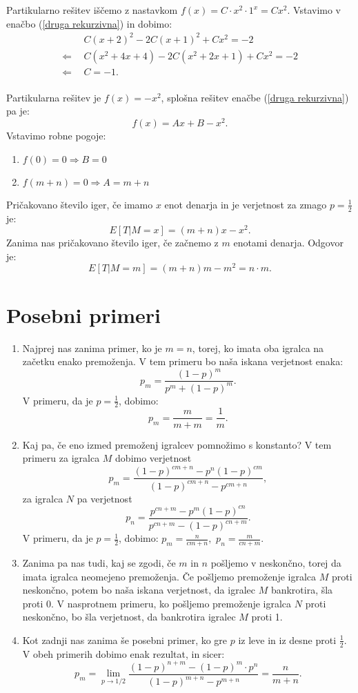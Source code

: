 \documentclass[12pt, a4paper]{article}
\begin{document}
Partikularno rešitev iščemo z nastavkom $f(x)=C\cdot x^2\cdot 1^x= Cx^2$. Vstavimo v enačbo (\ref{druga rekurzivna}) in dobimo:
\begin{equation*}
\begin{split}
 & ~~C(x+2)^2-2C(x+1)^2+Cx^2=-2\\
\Leftarrow & ~~C(x^2+4x+4)-2C(x^2+2x+1)+Cx^2=-2\\
\Leftarrow &  ~~C = -1 .\\
\end{split}
\end{equation*}

Partikularna rešitev je $f(x)=-x^2$, splošna rešitev enačbe (\ref{druga rekurzivna}) pa je: $$f(x)=Ax+B-x^2.$$
Vstavimo robne pogoje:
\begin{enumerate}
\item $f(0)=0\Rightarrow B = 0$
\item $f(m+n)=0 \Rightarrow A = m+n$
\end{enumerate}
Pričakovano število iger, če imamo $x$ enot denarja in je verjetnost za zmago $p=\frac{1}{2}$ je: $$E[T|M=x]= (m+n)x-x^2.$$
Zanima nas pričakovano število iger, če začnemo z $m$ enotami denarja. Odgovor je:$$E[T|M=m]=(m+n)m-m^2= n\cdot m.$$

\newpage

\section{Posebni primeri}

\begin{enumerate}
\item Najprej nas zanima primer, ko je $m = n$, torej, ko imata oba igralca na začetku enako premoženja. V tem primeru bo naša iskana verjetnost enaka: 
$$p_m = \frac{(1-p)^m}{p^m+(1-p)^m}.$$
V primeru, da je $p = \frac{1}{2}$, dobimo: 
$$p_m = \frac{m}{m + m} = \frac{1}{m}.$$

\item Kaj pa, če eno izmed premoženj igralcev pomnožimo s konstanto? V tem primeru za igralca $M$ dobimo verjetnost
$$p_m = \frac{(1-p)^{c m+n}-p^n (1-p)^{c m}}{(1-p)^{c m+n}-p^{c m+n}},$$ za igralca $N$ pa verjetnost
$$p_n = \frac{p^{c n+m}-p^m (1-p)^{c n}}{p^{c n+m}-(1-p)^{c n+m}}.$$
V primeru, da je $p = \frac{1}{2}$, dobimo: 
$p_m = \frac{n}{cm + n},$ $p_n = \frac{m}{cn + m}.$
\item Zanima pa nas tudi, kaj se zgodi, če $m$ in $n$ pošljemo v neskončno, torej da imata igralca neomejeno premoženja.
Če pošljemo premoženje igralca $M$ proti neskončno, potem bo naša iskana verjetnost, da igralec $M$ bankrotira, šla proti 0. V nasprotnem primeru, ko pošljemo premoženje igralca $N$ proti neskončno, bo šla verjetnost, da bankrotira igralec $M$ proti 1.

\item Kot zadnji nas zanima še posebni primer, ko gre $p$ iz leve in iz desne proti $\frac{1}{2}$. V obeh primerih dobimo enak rezultat, in sicer: 
$$p_m = \lim_{p \to 1/2}  \frac{(1-p)^{n+m} - (1-p)^m \cdot p^n}{(1-p)^{m+n} - p^{m+n}}  =\frac{n}{m + n}.$$

\end{enumerate}
\end{document}
